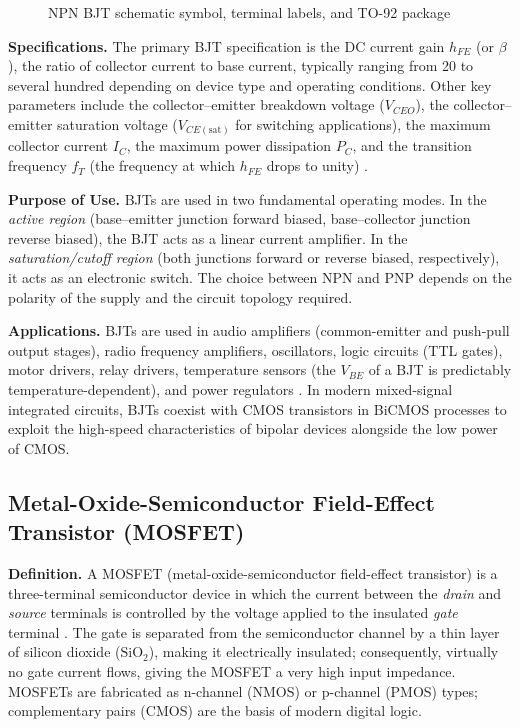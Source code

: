 \documentclass[12pt, a4paper, twoside]{report}
\newcommand{\imgplaceholder}[2]{%
  \begin{figure}[H]
    \centering
    \fcolorbox{gray!60}{gray!12}{%
      \parbox[c][5cm][c]{0.65\textwidth}{%
        \centering
        \textcolor{gray!80}{\Large [Image Placeholder]}\\[6pt]
        \textcolor{gray}{\small Insert figure here}
      }%
    }
    \caption{#1}
    \label{fig:#2}
  \end{figure}
}
\begin{document}
\imgplaceholder{NPN BJT schematic symbol, terminal labels, and TO-92 package}{bjt}

\textbf{Specifications.}\quad
The primary BJT specification is the DC current gain $h_{FE}$ (or $\beta$), the ratio
of collector current to base current, typically ranging from 20 to several hundred
depending on device type and operating conditions. Other key parameters include the
collector--emitter breakdown voltage ($V_{CEO}$), the collector--emitter saturation
voltage ($V_{CE(\text{sat})}$ for switching applications), the maximum collector current
$I_C$, the maximum power dissipation $P_C$, and the transition frequency $f_T$
(the frequency at which $h_{FE}$ drops to unity) \cite{sedra2020}.

\textbf{Purpose of Use.}\quad
BJTs are used in two fundamental operating modes. In the \textit{active region}
(base--emitter junction forward biased, base--collector junction reverse biased), the BJT
acts as a linear current amplifier. In the \textit{saturation/cutoff region} (both
junctions forward or reverse biased, respectively), it acts as an electronic switch.
The choice between NPN and PNP depends on the polarity of the supply and the circuit
topology required.

\textbf{Applications.}\quad
BJTs are used in audio amplifiers (common-emitter and push-pull output stages), radio
frequency amplifiers, oscillators, logic circuits (TTL gates), motor drivers, relay
drivers, temperature sensors (the $V_{BE}$ of a BJT is predictably temperature-dependent),
and power regulators \cite{razavi2013}. In modern mixed-signal integrated circuits, BJTs
coexist with CMOS transistors in BiCMOS processes to exploit the high-speed characteristics
of bipolar devices alongside the low power of CMOS.

\subsection{Metal-Oxide-Semiconductor Field-Effect Transistor (MOSFET)}

\textbf{Definition.}\quad
A MOSFET (metal-oxide-semiconductor field-effect transistor) is a three-terminal
semiconductor device in which the current between the \textit{drain} and \textit{source}
terminals is controlled by the voltage applied to the insulated \textit{gate} terminal
\cite{wiki:mosfet}. The gate is separated from the semiconductor channel by a thin layer
of silicon dioxide ($\text{SiO}_2$), making it electrically insulated; consequently,
virtually no gate current flows, giving the MOSFET a very high input impedance. MOSFETs
are fabricated as n-channel (NMOS) or p-channel (PMOS) types; complementary pairs (CMOS)
are the basis of modern digital logic.
\end{document}
